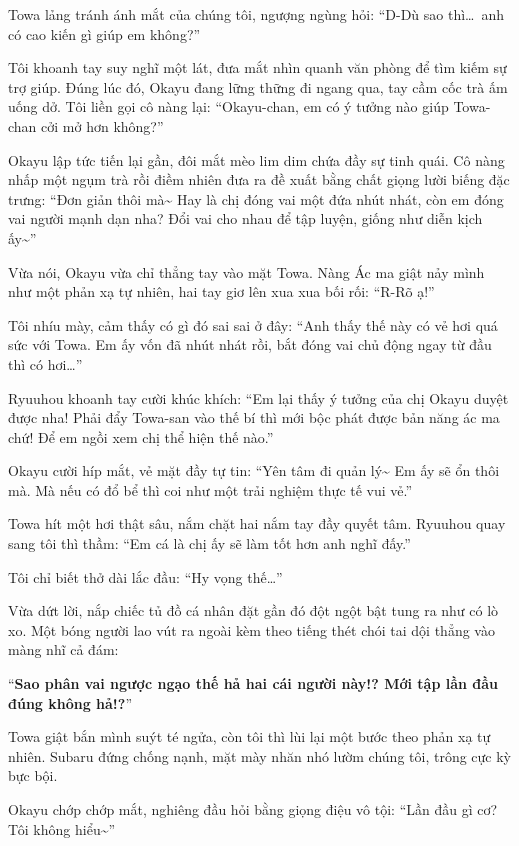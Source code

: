\documentclass[../main.tex]{subfiles}
\begin{document}
Towa lảng tránh ánh mắt của chúng tôi, ngượng ngùng hỏi: ``D-Dù sao thì\dots\ anh có cao kiến gì giúp em không?''

Tôi khoanh tay suy nghĩ một lát, đưa mắt nhìn quanh văn phòng để tìm kiếm sự trợ giúp. Đúng lúc đó, Okayu đang lững thững đi ngang qua, tay cầm cốc trà ấm uống dở. Tôi liền gọi cô nàng lại: ``Okayu-chan, em có ý tưởng nào giúp Towa-chan cởi mở hơn không?''

Okayu lập tức tiến lại gần, đôi mắt mèo lim dim chứa đầy sự tinh quái. Cô nàng nhấp một ngụm trà rồi điềm nhiên đưa ra đề xuất bằng chất giọng lười biếng đặc trưng: ``Đơn giản thôi mà\~{} Hay là chị đóng vai một đứa nhút nhát, còn em đóng vai người mạnh dạn nha? Đổi vai cho nhau để tập luyện, giống như diễn kịch ấy\~{}''


Vừa nói, Okayu vừa chỉ thẳng tay vào mặt Towa. Nàng Ác ma giật nảy mình như một phản xạ tự nhiên, hai tay giơ lên xua xua bối rối: ``R-Rõ ạ!''

Tôi nhíu mày, cảm thấy có gì đó sai sai ở đây: ``Anh thấy thế này có vẻ hơi quá sức với Towa. Em ấy vốn đã nhút nhát rồi, bắt đóng vai chủ động ngay từ đầu thì có hơi\dots''

Ryuuhou khoanh tay cười khúc khích: ``Em lại thấy ý tưởng của chị Okayu duyệt được nha! Phải đẩy Towa-san vào thế bí thì mới bộc phát được bản năng ác ma chứ! Để em ngồi xem chị thể hiện thế nào.''

Okayu cười híp mắt, vẻ mặt đầy tự tin: ``Yên tâm đi quản lý\~{} Em ấy sẽ ổn thôi mà. Mà nếu có đổ bể thì coi như một trải nghiệm thực tế vui vẻ.''

Towa hít một hơi thật sâu, nắm chặt hai nắm tay đầy quyết tâm. Ryuuhou quay sang tôi thì thầm: ``Em cá là chị ấy sẽ làm tốt hơn anh nghĩ đấy.''

Tôi chỉ biết thở dài lắc đầu: ``Hy vọng thế\dots''

Vừa dứt lời, nắp chiếc tủ đồ cá nhân đặt gần đó đột ngột bật tung ra như có lò xo. Một bóng người lao vút ra ngoài kèm theo tiếng thét chói tai dội thẳng vào màng nhĩ cả đám:

``\textbf{Sao phân vai ngược ngạo thế hả hai cái người này!? Mới tập lần đầu đúng không hả!?}''

Towa giật bắn mình suýt té ngửa, còn tôi thì lùi lại một bước theo phản xạ tự nhiên. Subaru đứng chống nạnh, mặt mày nhăn nhó lườm chúng tôi, trông cực kỳ bực bội.


Okayu chớp chớp mắt, nghiêng đầu hỏi bằng giọng điệu vô tội: ``Lần đầu gì cơ? Tôi không hiểu\~{}''
\end{document}
